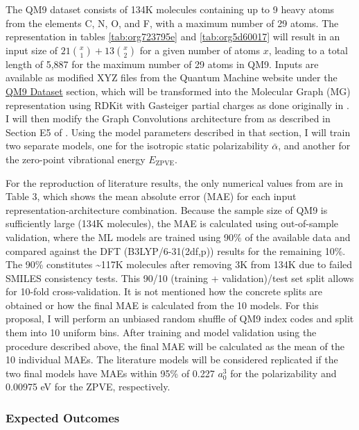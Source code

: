 \documentclass[12pt]{article}
\begin{document}
The QM9 dataset consists of 134K molecules \cite{Ramakrishnan:2014ij} containing up to 9 heavy atoms from the elements C, N, O, and F, with a maximum number of 29 atoms. The representation in tables \ref{tab:org723795e} and \ref{tab:org5d60017} will result in an input size of \(21\binom{x}{1} + 13\binom{x}{2}\) for a given number of atoms \(x\), leading to a total length of 5,887 for the maximum number of 29 atoms in QM9. Inputs are available as modified XYZ files from the Quantum Machine website under the \href{http://figshare.com/collections/Quantum\_chemistry\_structures\_and\_properties\_of\_134\_kilo\_molecules/978904}{QM9 Dataset} section\cite{Ramakrishnan:2014ij,doi:10.1021/ci300415d}, which will be transformed into the Molecular Graph (MG) representation using RDKit\cite{rdkit} with Gasteiger partial charges as done originally in \parencite{Kearnes2016}. I will then modify the Graph Convolutions architecture from \parencite{Kearnes2016} as described in Section E5 of \parencite{2017arXiv170205532F}. Using the model parameters described in that section, I will train two separate models, one for the isotropic static polarizability \(\bar{\alpha}\), and another for the zero-point vibrational energy \(E_\text{ZPVE}\).

For the reproduction of literature results, the only numerical values from \parencite{2017arXiv170205532F} are in Table 3, which shows the mean absolute error (MAE) for each input representation-architecture combination. Because the sample size of QM9 is sufficiently large (134K molecules), the MAE is calculated using out-of-sample validation, where the ML models are trained using 90\% of the available data and compared against the DFT (B3LYP/6-31(2df,p)) results for the remaining 10\%. The 90\% constitutes \textasciitilde{}117K molecules after removing 3K from 134K due to failed SMILES consistency tests. This 90/10 (training + validation)/test set split allows for 10-fold cross-validation. It is not mentioned how the concrete splits are obtained or how the final MAE is calculated from the 10 models. For this proposal, I will perform an unbiased random shuffle of QM9 index codes and split them into 10 uniform bins. After training and model validation using the procedure described above, the final MAE will be calculated as the mean of the 10 individual MAEs. The literature models will be considered replicated if the two final models have MAEs within 95\% of 0.227 \(a_{0}^{3}\) for the polarizability and 0.00975 eV for the ZPVE, respectively.

\subsubsection{Expected Outcomes}
\label{sec:orgccf8f0e}
\end{document}

